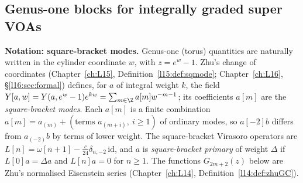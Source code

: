 \subsection{Genus-one blocks for integrally graded super VOAs}

\textbf{Notation: square-bracket modes.} Genus-one (torus) quantities are naturally written in the
cylinder coordinate $w$, with $z=e^{w}-1$. Zhu's change of coordinates
(Chapter~\ref{ch:L15}, Definition~\ref{l15:def:sqmode}; Chapter~\ref{ch:L16}, §\ref{l16:sec:formal})
defines, for $a$ of integral weight $k$, the field $Y[a,w]=Y(a,e^{w}-1)e^{kw}=\sum_{m\in\Z}a[m]w^{-m-1}$;
its coefficients $a[m]$ are the \emph{square-bracket modes}. Each $a[m]$ is a finite combination
$a[m]=a_{(m)}+(\text{terms }a_{(m+i)},\ i\ge1)$ of ordinary modes, so $a[-2]b$ differs from $a_{(-2)}b$
by terms of lower weight. The square-bracket Virasoro operators are
$L[n]=\omega[n+1]-\frac c{24}\delta_{n,-2}\,\mathrm{id}$, and $a$ is \emph{square-bracket primary} of weight $\Delta$
if $L[0]a=\Delta a$ and $L[n]a=0$ for $n\ge1$. The functions $G_{2m+2}(z)$ below are Zhu's normalised
Eisenstein series (Chapter~\ref{ch:L14}, Definition~\ref{l14:def:zhuGC}).

